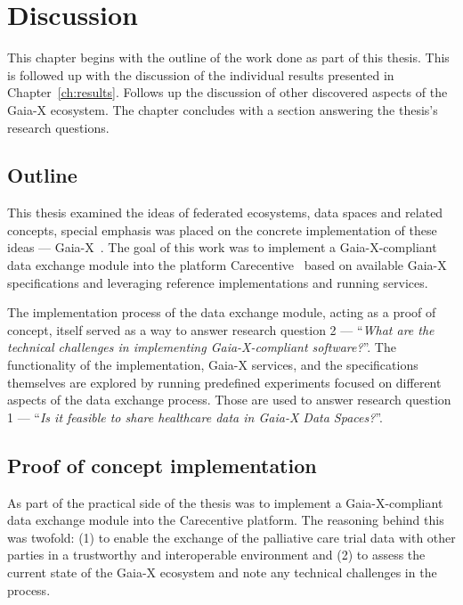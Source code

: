 \chapter{Discussion}\label{ch:discussion}

\begin{chapterabstract}
    This chapter begins with the outline of the work done as part of this thesis.
    This is followed up with the discussion of the individual results presented in Chapter~\ref{ch:results}.
    Follows up the discussion of other discovered aspects of the Gaia-X ecosystem.
    The chapter concludes with a section answering the thesis's research questions.
\end{chapterabstract}

\section{Outline}\label{sec:discussion_outline}

This thesis examined the ideas of federated ecosystems, data spaces and related concepts, special emphasis was placed on the concrete implementation of these ideas --- Gaia-X~\cite{gaiax}.
The goal of this work was to implement a Gaia-X-compliant data exchange module into the platform Carecentive~\cite{carecentive} based on available Gaia-X specifications and leveraging reference implementations and running services.

The implementation process of the data exchange module, acting as a proof of concept, itself served as a way to answer research question 2 --- ``\textit{What are the technical challenges in implementing Gaia-X-compliant software?}''.
The functionality of the implementation, Gaia-X services, and the specifications themselves are explored by running predefined experiments focused on different aspects of the data exchange process.
Those are used to answer research question 1 --- ``\textit{Is it feasible to share healthcare data in Gaia-X Data Spaces?}''.

\section{Proof of concept implementation}\label{sec:proof-of-concept-implementation}

As part of the practical side of the thesis was to implement a Gaia-X-compliant data exchange module into the Carecentive platform.
The reasoning behind this was twofold: (1) to enable the exchange of the palliative care trial data with other parties in a trustworthy and interoperable environment and (2) to assess the current state of the Gaia-X ecosystem and note any technical challenges in the process.

